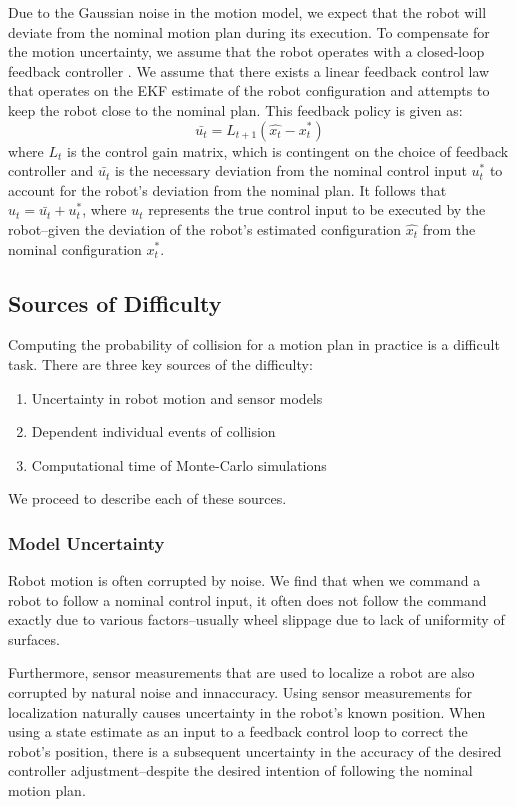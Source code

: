 \documentclass[journal]{IEEEtran}
\begin{document}
Due to the Gaussian noise in the motion model, we expect that the robot will deviate from the nominal motion plan during its execution. To compensate for the motion uncertainty, we assume that the robot operates with a closed-loop feedback controller \cite{IEEEhowto:stengel}. We assume that there exists a linear feedback control law that operates on the EKF estimate of the robot configuration and attempts to keep the robot close to the nominal plan. This feedback policy is given as:%
$$\bar{u_t} = L_{t+1}(\hat{x_t} - x_t^*) $$
where $L_{t}$ is the control gain matrix, which is contingent on the choice of feedback controller \cite{IEEEhowto:stengel} and $\bar{u_t}$ is the necessary deviation from the nominal control input $u_t^*$ to account for the robot's deviation from the nominal plan. It follows that $u_t = \bar{u_t} + u_t^*$, where $u_t$ represents the true control input to be executed by the robot--given the deviation of the robot's estimated configuration $\hat{x_t}$ from the nominal configuration $x_t^*$.

\subsection{Sources of Difficulty}
Computing the probability of collision for a motion plan in practice is a difficult task. There are three key sources of the difficulty:
\begin{enumerate}
\item Uncertainty in robot motion and sensor models
\item Dependent individual events of collision
\item Computational time of Monte-Carlo simulations
\end{enumerate}

We proceed to describe each of these sources.
\subsubsection{Model Uncertainty}
Robot motion is often corrupted by noise. We find that when we command a robot to follow a nominal control input, it often does not follow the command exactly due to various factors--usually wheel slippage due to lack of uniformity of surfaces.

Furthermore, sensor measurements that are used to localize a robot are also corrupted by natural noise and innaccuracy. Using sensor measurements for localization naturally causes uncertainty in the robot's known position. When using a state estimate as an input to a feedback control loop to correct the robot's position, there is a subsequent uncertainty in the accuracy of the desired controller adjustment--despite the desired intention of following the nominal motion plan.
\end{document}
